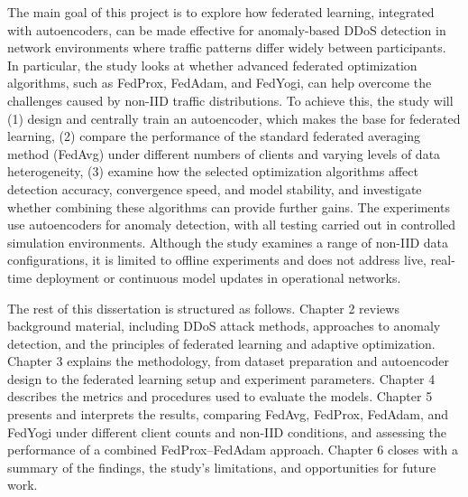 The main goal of this project is to explore how federated learning, integrated with autoencoders, can be made effective for anomaly-based DDoS detection in network environments where traffic patterns differ widely between participants. In particular, the study looks at whether advanced federated optimization algorithms, such as FedProx, FedAdam, and FedYogi, can help overcome the challenges caused by non-IID traffic distributions. To achieve this, the study will (1) design and centrally train an autoencoder, which makes the base for federated learning, (2) compare the performance of the standard federated averaging method (FedAvg) under different numbers of clients and varying levels of data heterogeneity, (3) examine how the selected optimization algorithms affect detection accuracy, convergence speed, and model stability, and investigate whether combining these algorithms can provide further gains. The experiments use autoencoders for anomaly detection, with all testing carried out in controlled simulation environments. Although the study examines a range of non-IID data configurations, it is limited to offline experiments and does not address live, real-time deployment or continuous model updates in operational networks.

The rest of this dissertation is structured as follows. Chapter 2 reviews background material, including DDoS attack methods, approaches to anomaly detection, and the principles of federated learning and adaptive optimization. Chapter 3 explains the methodology, from dataset preparation and autoencoder design to the federated learning setup and experiment parameters. Chapter 4 describes the metrics and procedures used to evaluate the models. Chapter 5 presents and interprets the results, comparing FedAvg, FedProx, FedAdam, and FedYogi under different client counts and non-IID conditions, and assessing the performance of a combined FedProx–FedAdam approach. Chapter 6 closes with a summary of the findings, the study’s limitations, and opportunities for future work.

